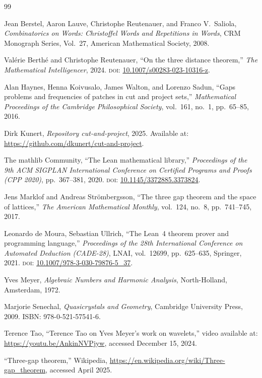 \documentclass[11pt]{article}
\theoremstyle{plain}
\theoremstyle{definition}
\theoremstyle{remark}
\begin{document}
\begin{thebibliography}{99}

Jean Berstel, Aaron Lauve, Christophe Reutenauer, and Franco V.\ Saliola,
\emph{Combinatorics on Words: Christoffel Words and Repetitions in Words},
CRM Monograph Series, Vol.~27,
American Mathematical Society, 2008.

Val\'{e}rie Berth\'{e} and Christophe Reutenauer,
``On the three distance theorem,''
\emph{The Mathematical Intelligencer}, 2024.
\textsc{doi}: \href{https://doi.org/10.1007/s00283-023-10316-z}%
{10.1007/s00283-023-10316-z}.

Alan Haynes, Henna Koivusalo, James Walton, and Lorenzo Sadun,
``Gaps problems and frequencies of patches in cut and project sets,''
\emph{Mathematical Proceedings of the Cambridge Philosophical Society},
vol.~161, no.~1, pp.~65--85, 2016.

Dirk Kunert,
\emph{Repository cut-and-project}, 2025.
Available at: \url{https://github.com/dkunert/cut-and-project}.

The mathlib Community,
``The Lean mathematical library,''
\emph{Proceedings of the 9th ACM SIGPLAN International Conference on
Certified Programs and Proofs (CPP 2020)},
pp.~367--381, 2020.
\textsc{doi}: \href{https://doi.org/10.1145/3372885.3373824}%
{10.1145/3372885.3373824}.

Jens Marklof and Andreas Str\"{o}mbergsson,
``The three gap theorem and the space of lattices,''
\emph{The American Mathematical Monthly}, vol.~124, no.~8, pp.~741--745,
2017.

Leonardo de Moura, Sebastian Ullrich,
``The Lean~4 theorem prover and programming language,''
\emph{Proceedings of the 28th International Conference on Automated
Deduction (CADE-28)},
LNAI, vol.~12699, pp.~625--635, Springer, 2021.
\textsc{doi}: \href{https://doi.org/10.1007/978-3-030-79876-5_37}%
{10.1007/978-3-030-79876-5\_37}.

Yves Meyer,
\emph{Algebraic Numbers and Harmonic Analysis},
North-Holland, Amsterdam, 1972.

Marjorie Senechal,
\emph{Quasicrystals and Geometry},
Cambridge University Press, 2009.
ISBN: 978-0-521-57541-6.

Terence Tao,
``Terence Tao on Yves Meyer's work on wavelets,''
video available at: \url{https://youtu.be/AnkinNVPjyw}, accessed
December 15, 2024.

``Three-gap theorem,''
Wikipedia,
\url{https://en.wikipedia.org/wiki/Three-gap_theorem}, accessed April 2025.

\end{thebibliography}
\end{document}
